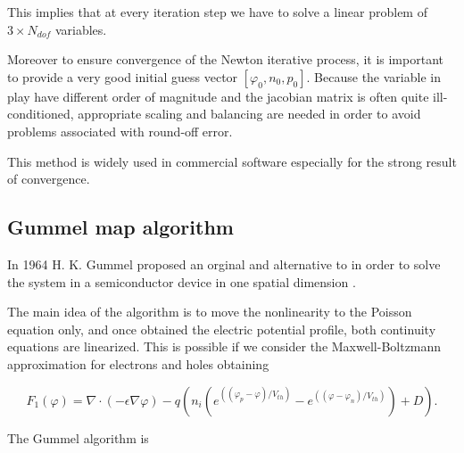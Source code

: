 This implies that at every iteration step we have to solve a linear problem of $3 \times N_{dof}$ variables.

Moreover to ensure convergence of the Newton iterative process, it is important to provide a very good initial guess vector $[\varphi_0,n_0,p_0]$. Because the variable in play have different order of magnitude and the jacobian matrix is often quite ill-conditioned, appropriate scaling and balancing are needed in order to avoid problems associated with round-off error. 

This method is widely used in commercial software especially for the strong result of convergence.


\subsection{Gummel map algorithm}

In 1964 H. K. Gummel proposed an orginal and alternative to   in order to solve the system  in a semiconductor device in one spatial dimension \cite{GummelMap}.

The main idea of the algorithm is to move the nonlinearity to the Poisson equation only, and once obtained the electric potential profile, both continuity equations are linearized. This is possible if we consider the Maxwell-Boltzmann approximation for electrons  and holes  obtaining

\begin{equation}
F_1(\varphi)  =  \nabla \cdot (-\epsilon \nabla \varphi) - q(n_i(e^{((\varphi_p-\varphi)/V_{th})}-e^{((\varphi-\varphi_n)/V_{th})})+D) .
\end{equation}

The Gummel algorithm is

